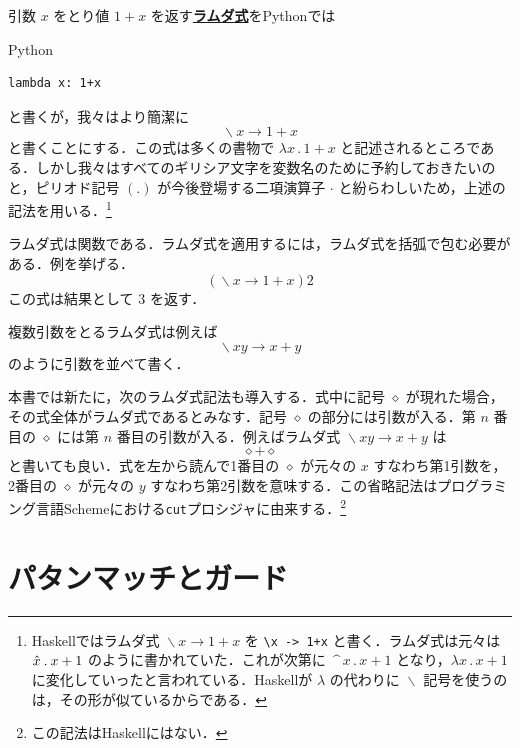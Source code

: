 \documentclass[a4paper,twocolumn]{jsbook}
\newcommand{\programminglanguage}[1]{\textsf{#1}}
\newcommand{\haskell}{\programminglanguage{Haskell}}
\newcommand{\python}{\programminglanguage{Python}}
\newcommand{\scheme}{\programminglanguage{Scheme}}
\newcommand{\keyword}[1]{{\underline{\textbf{#1}}}}
\newcommand{\code}[1]{\texttt{#1}}
\newenvironment{pythoncode}{\begin{itembox}[r]{\python}}{\end{itembox}}
\newcommand{\mAnonParam}{\diamond}
\DeclareMathOperator{\mLambda}{\backslash}
\DeclareMathOperator{\mLambdaArrow}{\rightarrow}
\newcommand{\mLambdaExp}[2]{\mLambda{#1}\mLambdaArrow{#2}}
\begin{document}
引数 $x$ をとり値 $1+x$ を返す\keyword{ラムダ式}を\python では
\begin{pythoncode}
\begin{verbatim}
lambda x: 1+x
\end{verbatim}
\end{pythoncode}
と書くが，我々はより簡潔に
\begin{equation}
\mLambdaExp{x}{1+x}
\end{equation}
と書くことにする．この式は多くの書物で $\lambda x\mathbin{.}1+x$ と記述されるところである．しかし我々はすべてのギリシア文字を変数名のために予約しておきたいのと，ピリオド記号 $(.)$ が今後登場する二項演算子 $\cdot$ と紛らわしいため，上述の記法を用いる．\footnote{\haskell ではラムダ式 $\mLambdaExp{x}{1+x}$ を \code{\textbackslash x -> 1+x} と書く．ラムダ式は元々は $\Hat x\mathbin{.}x+1$ のように書かれていた．これが次第に $\mathop{\texttt{\textasciicircum}}x\mathbin{.}x+1$ となり，$\lambda x\mathbin{.}x+1$ に変化していったと言われている．\haskell が $\lambda$ の代わりに $\mLambda$ 記号を使うのは，その形が似ているからである．}

ラムダ式は関数である．ラムダ式を適用するには，ラムダ式を括弧で包む必要がある．例を挙げる．
\begin{equation}
(\mLambdaExp{x}{1+x})2
\end{equation}
この式は結果として $3$ を返す．

複数引数をとるラムダ式は例えば
\begin{equation}
\mLambdaExp{xy}{x+y}
\end{equation}
のように引数を並べて書く．

本書では新たに，次のラムダ式記法も導入する．式中に記号 $\mAnonParam$ が現れた場合，その式全体がラムダ式であるとみなす．記号 $\mAnonParam$ の部分には引数が入る．第 $n$ 番目の $\mAnonParam$ には第 $n$ 番目の引数が入る．例えばラムダ式 $\mLambdaExp{xy}{x+y}$ は
\begin{equation}
\mAnonParam+\mAnonParam
\end{equation}
と書いても良い．式を左から読んで1番目の $\mAnonParam$ が元々の $x$ すなわち第1引数を，2番目の $\mAnonParam$ が元々の $y$ すなわち第2引数を意味する．この省略記法はプログラミング言語\scheme における\code{cut}プロシジャに由来する．\footnote{この記法は\haskell にはない．}

\section{パタンマッチとガード}
\end{document}
